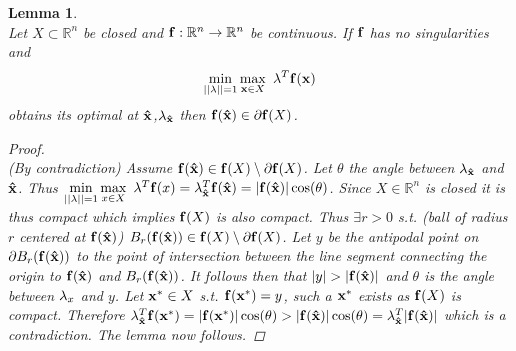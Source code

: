 \documentclass[11pt]{article}
\theoremstyle{plain}
\newtheorem{lem}[thm]{Lemma}
\theoremstyle{definition}
\theoremstyle{remark}
\begin{document}
\begin{lem} \ \\
\label{lem:BdOpt}
Let $X\subset\mathbb{R}^n$ be closed and $\bold{f}:\mathbb{R}^n\rightarrow\mathbb{R}^n$ be continuous. 
If $\bold{f}$ has no singularities and $$\min\limits_{||\bold{\lambda}||=1}\max\limits_{\bold x\in X}\ \bold{\lambda}^T\bold{f}(\bold x)$$
obtains its optimal at $\bold{\hat{x}}$,$\bold{\lambda}_{\bold{\hat{x}}}$ then $\bold{f}(\bold{\hat{x}})\in \partial \bold{f}(X)$. 

\begin{proof} \ \\
(By contradiction) Assume $\bold{f}(\bold{\hat{x}})\in \bold{f}(X)\setminus\partial \bold{f}(X)$. 
Let $\theta$ the angle between $\bold{\lambda}_{\bold{\hat{x}}}$ and $\bold{\hat{x}}$. 
Thus $\min\limits_{||\bold{\lambda}||=1}\max\limits_{x\in X}\ \bold{\lambda}^T\bold{f}(x)=\bold{\lambda}_{\bold{\hat{x}}}^T\bold{f}(\bold{\hat{x}})=|\bold{f}(\bold{\hat{x}})|\cos(\theta)$. 
Since $X\in\mathbb{R}^n$ is closed it is thus compact which implies $\bold{f}(X)$ is also compact. 
Thus $\exists r>0$ s.t. (ball of radius $r$ centered at $\bold{f}(\bold{\hat{x}})$) $B_r(\bold{f}(\bold{\hat{x}}))\in \bold{f}(X)\setminus\partial \bold{f}(X)$. 
Let $y$ be the antipodal point on $\partial B_r(\bold{f}(\bold{\hat{x}}))$ to the point of intersection between the line segment connecting the origin to $\bold{f}(\bold{\hat{x}})$ and $B_r(\bold{f}(\bold{\hat{x}}))$. 
It follows then that $|y|>|\bold{f}(\bold{\hat{x}})|$ and $\theta$ is the angle between $\bold{\lambda}_x$ and $y$.   
Let $\bold{x^*}\in X$ s.t. $\bold{f}(\bold{x^*})=y$, such a $\bold{x^*}$ exists as $\bold{f}(X)$ is compact. 
Therefore $\bold{\lambda}_{\bold{\hat{x}}}^T\bold{f}(\bold{x^*})=|\bold{f}(\bold{x^*})|\cos(\theta)>|\bold{f}(\bold{\hat{x}})|\cos(\theta)=\bold{\lambda}_{\bold{\hat{x}}}^T|\bold{f}(\bold{\hat{x}})|$ which is a contradiction. 
The lemma now follows.
\end{proof}
\end{lem}
\end{document}
